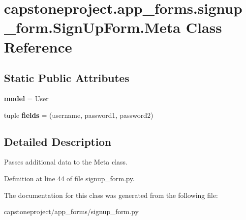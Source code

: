\hypertarget{classcapstoneproject_1_1app__forms_1_1signup__form_1_1_sign_up_form_1_1_meta}{}\section{capstoneproject.\+app\+\_\+forms.\+signup\+\_\+form.\+Sign\+Up\+Form.\+Meta Class Reference}
\label{classcapstoneproject_1_1app__forms_1_1signup__form_1_1_sign_up_form_1_1_meta}
\subsection*{Static Public Attributes}
\begin{DoxyCompactItemize}
\item 
\mbox{\label{classcapstoneproject_1_1app__forms_1_1signup__form_1_1_sign_up_form_1_1_meta_a5e9505720f7ccdf93179ba2dff778e61}} 
{\bfseries model} = User
\item 
\mbox{\label{classcapstoneproject_1_1app__forms_1_1signup__form_1_1_sign_up_form_1_1_meta_ab88d14c34ae4567f72b336a15a1633da}} 
tuple {\bfseries fields} = (\textquotesingle{}username\textquotesingle{}, \textquotesingle{}password1\textquotesingle{}, \textquotesingle{}password2\textquotesingle{})
\end{DoxyCompactItemize}


\subsection{Detailed Description}
\begin{DoxyVerb}Passes additional data to the Meta class.
\end{DoxyVerb}
 

Definition at line 44 of file signup\+\_\+form.\+py.



The documentation for this class was generated from the following file\+:\begin{DoxyCompactItemize}
\item 
capstoneproject/app\+\_\+forms/signup\+\_\+form.\+py\end{DoxyCompactItemize}
